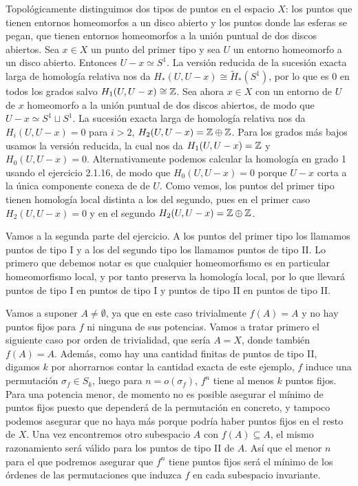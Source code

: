 \documentclass[twoside]{article}
\begin{document}
\begin{solucion}
Topológicamente distinguimos dos tipos de puntos en el espacio $X$: los puntos que tienen entornos homeomorfos a un disco abierto y los puntos donde las esferas se pegan, que tienen entornos homeomorfos a la unión puntual de dos discos abiertos. Sea $x\in X$ un punto del primer tipo y sea $U$ un entorno homeomorfo a un disco abierto. Entonces $U-x\simeq S^1$. La versión reducida de la sucesión exacta larga de homología relativa nos da $H_*(U,U-x)\cong \widetilde{H}_*(S^1)$, por lo que es 0 en todos los grados salvo $H_1(U,U-x)\cong\mathbb{Z}$. Sea ahora $x\in X$ con un entorno de $U$ de $x$ homeomorfo a la unión puntual de dos discos abiertos, de modo que $U-x\simeq S^1\sqcup S^1$. La sucesión exacta larga de homología relativa nos da $H_i(U,U-x)=0$ para $i>2$, $H_2(U,U-x)=\mathbb{Z}\oplus\mathbb{Z}$. Para los grados más bajos usamos la versión reducida, la cual nos da $H_1(U,U-x)=\mathbb{Z}$ y $H_0(U,U-x)=0$. Alternativamente podemos calcular la homología en grado 1 usando el ejercicio 2.1.16, de modo que $H_0(U,U-x)=0$ porque $U-x$ corta a la única componente conexa de de $U$. Como vemos, los puntos del primer tipo tienen homología local distinta a los del segundo, pues en el primer caso $H_2(U,U-x)=0$ y en el segundo $H_2(U,U-x)=\mathbb{Z}\oplus\mathbb{Z}$.

Vamos a la segunda parte del ejercicio. A los puntos del primer tipo los llamamos puntos de tipo I y a los del segundo tipo los llamamos puntos de tipo II. Lo primero que debemos notar es que cualquier homeomorfismo es en particular homeomorfismo local, y por tanto preserva la homología local, por lo que llevará puntos de tipo I en puntos de tipo I y puntos de tipo II en puntos de tipo II. 

Vamos a suponer $A\neq\emptyset$, ya que en este caso trivialmente $f(A)=A$ y no hay puntos fijos para $f$ ni ninguna de sus potencias. Vamos a tratar primero el siguiente caso por orden de trivialidad, que sería $A=X$, donde también $f(A)=A$. Además, como hay una cantidad finitas de puntos de tipo II, digamos $k$ por ahorrarnos contar la cantidad exacta de este ejemplo, $f$ induce una permutación $\sigma_f\in S_k$, luego para $n=o(\sigma_f)$, $f^n$ tiene al menos $k$ puntos fijos. Para una potencia menor, de momento no es posible asegurar el mínimo de puntos fijos puesto que dependerá de la permutación en concreto, y tampoco podemos asegurar que no haya más porque podría haber puntos fijos en el resto de $X$. Una vez encontremos otro subespacio $A$ con $f(A)\subseteq A$, el mismo razonamiento será válido para los puntos de tipo II de $A$. Así que el menor $n$ para el que podremos asegurar que $f^n$ tiene puntos fijos será el mínimo de los órdenes de las permutaciones que induzca $f$ en cada subespacio invariante. 


\end{solucion}
\end{document}
